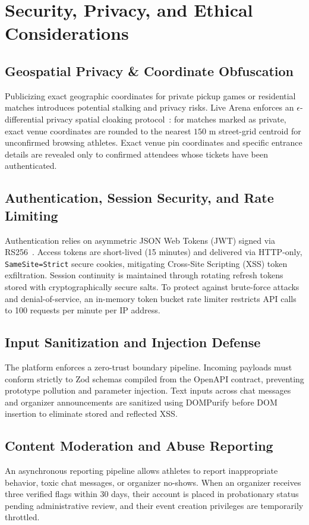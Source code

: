 \documentclass[conference]{IEEEtran}
\begin{document}
\section{Security, Privacy, and Ethical Considerations}

\subsection{Geospatial Privacy \& Coordinate Obfuscation}
Publicizing exact geographic coordinates for private pickup games or residential matches introduces potential stalking and privacy risks. Live Arena enforces an $\epsilon$-differential privacy spatial cloaking protocol~\cite{andres2020geo}: for matches marked as private, exact venue coordinates are rounded to the nearest $150\text{ m}$ street-grid centroid for unconfirmed browsing athletes. Exact venue pin coordinates and specific entrance details are revealed only to confirmed attendees whose tickets have been authenticated.

\subsection{Authentication, Session Security, and Rate Limiting}
Authentication relies on asymmetric JSON Web Tokens (JWT) signed via RS256~\cite{rfc7519}. Access tokens are short-lived (15 minutes) and delivered via HTTP-only, \texttt{SameSite=Strict} secure cookies, mitigating Cross-Site Scripting (XSS) token exfiltration. Session continuity is maintained through rotating refresh tokens stored with cryptographically secure salts. To protect against brute-force attacks and denial-of-service, an in-memory token bucket rate limiter restricts API calls to 100 requests per minute per IP address.

\subsection{Input Sanitization and Injection Defense}
The platform enforces a zero-trust boundary pipeline. Incoming payloads must conform strictly to Zod schemas compiled from the OpenAPI contract, preventing prototype pollution and parameter injection. Text inputs across chat messages and organizer announcements are sanitized using DOMPurify before DOM insertion to eliminate stored and reflected XSS.

\subsection{Content Moderation and Abuse Reporting}
An asynchronous reporting pipeline allows athletes to report inappropriate behavior, toxic chat messages, or organizer no-shows. When an organizer receives three verified flags within 30 days, their account is placed in probationary status pending administrative review, and their event creation privileges are temporarily throttled.
\end{document}
